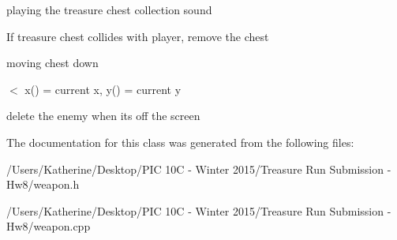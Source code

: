 playing the treasure chest collection sound

If treasure chest collides with player, remove the chest

moving chest down

$<$ x() = current x, y() = current y

delete the enemy when it\textquotesingle{}s off the screen 

The documentation for this class was generated from the following files\+:\begin{DoxyCompactItemize}
\item 
/\+Users/\+Katherine/\+Desktop/\+P\+I\+C 10\+C -\/ Winter 2015/\+Treasure Run Submission -\/ Hw8/weapon.\+h\item 
/\+Users/\+Katherine/\+Desktop/\+P\+I\+C 10\+C -\/ Winter 2015/\+Treasure Run Submission -\/ Hw8/weapon.\+cpp\end{DoxyCompactItemize}
